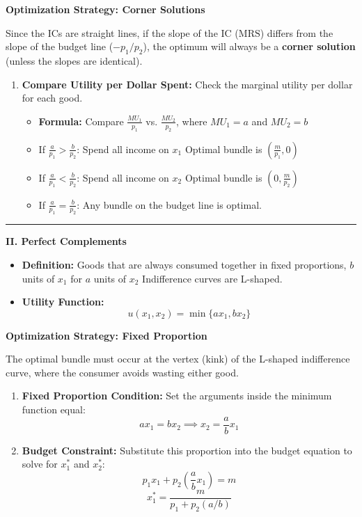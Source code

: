 \documentclass{article}
\begin{document}
\noindent\textbf{Optimization Strategy: Corner Solutions}

Since the ICs are straight lines, if the slope of the IC ($\text{MRS}$) differs from the slope of the budget line ($-p_1/p_2$), the optimum will always be a \textbf{corner solution} (unless the slopes are identical).

\begin{enumerate}
    \item \textbf{Compare Utility per Dollar Spent:} Check the marginal utility per dollar for each good.
    \begin{itemize}
        \item \textbf{Formula:} Compare $\frac{MU_1}{p_1}$ vs. $\frac{MU_2}{p_2}$, where $MU_1=a$ and $MU_2=b$
        \item If $\frac{a}{p_1} > \frac{b}{p_2}$: Spend all income on $x_1$ Optimal bundle is $\left(\frac{m}{p_1}, 0\right)$
        \item If $\frac{a}{p_1} < \frac{b}{p_2}$: Spend all income on $x_2$ Optimal bundle is $\left(0, \frac{m}{p_2}\right)$
        \item If $\frac{a}{p_1} = \frac{b}{p_2}$: Any bundle on the budget line is optimal.
    \end{itemize}
\end{enumerate}

\medskip\noindent\rule{\linewidth}{0.4pt}\medskip

\noindent\textbf{II. Perfect Complements}
\begin{itemize}
    \item \textbf{Definition:} Goods that are always consumed together in fixed proportions, $b$ units of $x_1$ for $a$ units of $x_2$ Indifference curves are L-shaped.
    \item \textbf{Utility Function:} \[u(x_1, x_2) = \min\{a x_1, b x_2\}\]
\end{itemize}

\noindent\textbf{Optimization Strategy: Fixed Proportion}

The optimal bundle must occur at the vertex (kink) of the L-shaped indifference curve, where the consumer avoids wasting either good.

\begin{enumerate}
    \item \textbf{Fixed Proportion Condition:} Set the arguments inside the minimum function equal: \[a x_1 = b x_2 \implies x_2 = \frac{a}{b} x_1\]
    \item \textbf{Budget Constraint:} Substitute this proportion into the budget equation to solve for $x_1^*$ and $x_2^*$: \[p_1 x_1 + p_2 \left(\frac{a}{b} x_1\right) = m\] \[x_1^* = \frac{m}{p_1 + p_2(a/b)}\]
\end{enumerate}
\end{document}
